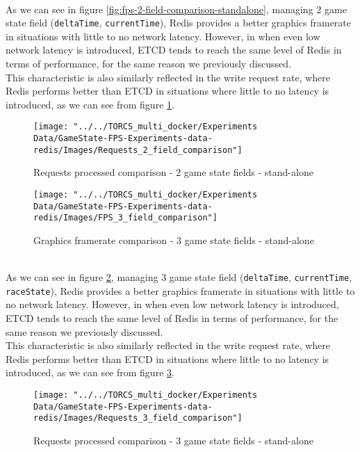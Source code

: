 \\ As we can see in figure \ref{fig:fps-2-field-comparison-standalone}, managing 2 game state field (\texttt{deltaTime}, \texttt{currentTime}), Redis provides a better graphics framerate in situations with little to no network latency. However, in when even low network latency is introduced, ETCD tends to reach the same level of Redis in terms of performance, for the same reason we previously discussed. \\
This characteristic is also similarly reflected in the write request rate, where Redis performs better than ETCD in situations where little to no latency is introduced, as we can see from figure \ref{fig:requests-2-field-comparison-standalone}.
\begin{figure}[h!]
	\centering
	\texttt{[image: "../../TORCS\_multi\_docker/Experiments Data/GameState-FPS-Experiments-data-redis/Images/Requests\_2\_field\_comparison"]}
	\caption[Requests processed comparison - 2 game state fields - stand-alone]{Requests processed comparison - 2 game state fields - stand-alone}
	\label{fig:requests-2-field-comparison-standalone}
\end{figure}
\begin{figure}[h!]
	\centering
	\texttt{[image: "../../TORCS\_multi\_docker/Experiments Data/GameState-FPS-Experiments-data-redis/Images/FPS\_3\_field\_comparison"]}
	\caption[Graphics framerate comparison - 3 game state fields - stand-alone]{Graphics framerate comparison - 3 game state fields - stand-alone}
	\label{fig:fps-3-field-comparison-standalone}
\end{figure}
\\ As we can see in figure \ref{fig:fps-3-field-comparison-standalone}, managing 3 game state field (\texttt{deltaTime}, \texttt{currentTime}, \texttt{raceState}), Redis provides a better graphics framerate in situations with little to no network latency. However, in when even low network latency is introduced, ETCD tends to reach the same level of Redis in terms of performance, for the same reason we previously discussed. \\
This characteristic is also similarly reflected in the write request rate, where Redis performs better than ETCD in situations where little to no latency is introduced, as we can see from figure \ref{fig:requests-3-field-comparison-standalone}.
\begin{figure}[h!]
	\centering
	\texttt{[image: "../../TORCS\_multi\_docker/Experiments Data/GameState-FPS-Experiments-data-redis/Images/Requests\_3\_field\_comparison"]}
	\caption[Requests processed comparison - 3 game state fields - stand-alone]{Requests processed comparison - 3 game state fields - stand-alone}
	\label{fig:requests-3-field-comparison-standalone}
\end{figure}
